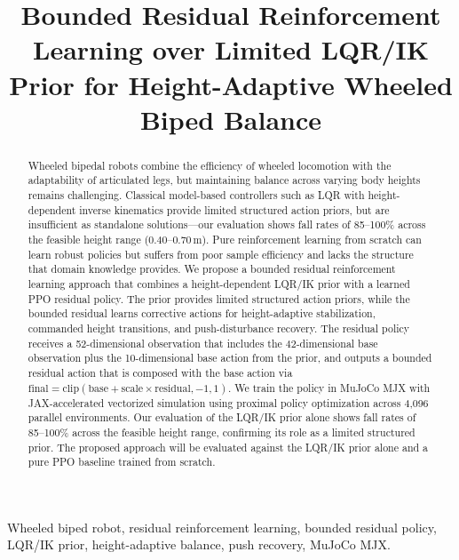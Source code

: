 \documentclass[conference]{IEEEtran}
\title{Bounded Residual Reinforcement Learning over Limited LQR/IK Prior for Height-Adaptive Wheeled Biped Balance}
\author{
\IEEEauthorblockN{Van Thuong Nguyen}
\IEEEauthorblockA{
Independent Researcher\\
Email: vanthuong180702t@gmail.com
}
}
\begin{document}
\maketitle

\begin{abstract}
Wheeled bipedal robots combine the efficiency of wheeled locomotion with the adaptability of articulated legs, but maintaining balance across varying body heights remains challenging.
Classical model-based controllers such as LQR with height-dependent inverse kinematics provide limited structured action priors, but are insufficient as standalone solutions---our evaluation shows fall rates of 85--100\% across the feasible height range (0.40--0.70\,m).
Pure reinforcement learning from scratch can learn robust policies but suffers from poor sample efficiency and lacks the structure that domain knowledge provides.
We propose a bounded residual reinforcement learning approach that combines a height-dependent LQR/IK prior with a learned PPO residual policy.
The prior provides limited structured action priors, while the bounded residual learns corrective actions for height-adaptive stabilization, commanded height transitions, and push-disturbance recovery.
The residual policy receives a 52-dimensional observation that includes the 42-dimensional base observation plus the 10-dimensional base action from the prior, and outputs a bounded residual action that is composed with the base action via $\text{final} = \text{clip}(\text{base} + \text{scale} \times \text{residual}, -1, 1)$.
We train the policy in MuJoCo MJX with JAX-accelerated vectorized simulation using proximal policy optimization across 4,096 parallel environments.
Our evaluation of the LQR/IK prior alone shows fall rates of 85--100\% across the feasible height range, confirming its role as a limited structured prior.
The proposed approach will be evaluated against the LQR/IK prior alone and a pure PPO baseline trained from scratch.
\end{abstract}

\begin{IEEEkeywords}
Wheeled biped robot, residual reinforcement learning, bounded residual policy, LQR/IK prior,
height-adaptive balance, push recovery, MuJoCo MJX.
\end{IEEEkeywords}

\end{document}
